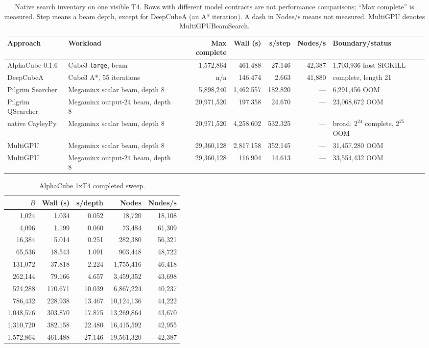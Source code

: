 \documentclass[10pt,twocolumn]{article}
\begin{document}
\begin{table}[t]
\centering
\small
\setlength{\tabcolsep}{3pt}
\caption{Native search inventory on one visible T4. Rows with different model
contracts are not performance comparisons; ``Max complete'' is measured.
Step means a beam depth, except for DeepCubeA (an A* iteration).
A dash in Nodes/s means not measured. MultiGPU denotes MultiGPUBeamSearch.}
\label{tab:four_t4}
\renewcommand{\arraystretch}{1.12}
\begin{tabularx}{\textwidth}{@{}L{2.45cm}L{2.45cm}rrrrY@{}}
\toprule
Approach & Workload & Max complete & Wall (s) & s/step & Nodes/s & Boundary/status \\
\midrule
AlphaCube 0.1.6 & Cube3 \texttt{large}, beam & 1,572,864 & 461.488 & 27.146 & 42,387 & 1,703,936 host SIGKILL \\
DeepCubeA & Cube3 A*, 55 iterations & n/a & 146.474 & 2.663 & 41,880 & complete, length 21 \\
Pilgrim Searcher & Megaminx scalar beam, depth 8 & 5,898,240 & 1,462.557 & 182.820 & --- & 6,291,456 OOM \\
Pilgrim QSearcher & Megaminx output-24 beam, depth 8 & 20,971,520 & 197.358 & 24.670 & --- & 23,068,672 OOM \\
native CayleyPy & Megaminx scalar beam, depth 8 & 20,971,520 & 4,258.602 & 532.325 & --- & broad: $2^{24}$ complete, $2^{25}$ OOM \\
MultiGPU & Megaminx scalar beam, depth 8 & 29,360,128 & 2,817.158 & 352.145 & --- & 31,457,280 OOM \\
MultiGPU & Megaminx output-24 beam, depth 8 & 29,360,128 & 116.904 & 14.613 & --- & 33,554,432 OOM \\
\bottomrule
\end{tabularx}
\end{table}

\begin{table}[t]
\centering
\small
\caption{AlphaCube 1xT4 completed sweep.}
\label{tab:alpha_curve}
\begin{tabular}{@{}rrrrr@{}}
\toprule
$B$ & Wall (s) & s/depth & Nodes & Nodes/s \\
\midrule
1,024 & 1.034 & 0.052 & 18,720 & 18,108 \\
4,096 & 1.199 & 0.060 & 73,484 & 61,309 \\
16,384 & 5.014 & 0.251 & 282,380 & 56,321 \\
65,536 & 18.543 & 1.091 & 903,448 & 48,722 \\
131,072 & 37.818 & 2.224 & 1,755,416 & 46,418 \\
262,144 & 79.166 & 4.657 & 3,459,352 & 43,698 \\
524,288 & 170.671 & 10.039 & 6,867,224 & 40,237 \\
786,432 & 228.938 & 13.467 & 10,124,136 & 44,222 \\
1,048,576 & 303.870 & 17.875 & 13,269,864 & 43,670 \\
1,310,720 & 382.158 & 22.480 & 16,415,592 & 42,955 \\
1,572,864 & 461.488 & 27.146 & 19,561,320 & 42,387 \\
\bottomrule
\end{tabular}
\end{table}
\end{document}
